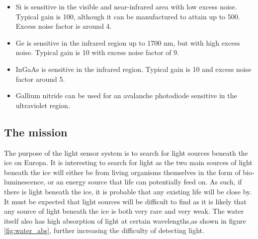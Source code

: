 \begin{itemize}

\item Si is sensitive in the visible and near-infrared area with low excess noise. Typical gain is 100, although it can be manufactured to attain up to 500. Excess noise factor is around 4.
\\
\item Ge is sensitive in the infrared region up to 1700 nm, but with high excess noise. Typical gain is 10 with excess noise factor of 9.
\\
\item InGaAs is sensitive in the infrared region. Typical gain is 10 and excess noise factor around 5.
\\
\item Gallium nitride can be used for an avalanche photodiode sensitive in the ultraviolet region. 

\end{itemize}

\subsection{The mission}

The purpose of the light sensor system is to search for light sources beneath the ice on Europa. It is interesting to search for light as the two main sources of light beneath the ice will either be from living organisms themselves in the form of bio-luminescence, or an energy source that life can potentially feed on. As such, if there is light beneath the ice, it is probable that any existing life will be close by. It must be expected that light sources will be difficult to find as it is likely that any source of light beneath the ice is both very rare and very weak. The water itself also has high absorption of light at certain wavelengths,as shown in figure \ref{fig:water_abs}, further increasing the difficulty of detecting light.  

